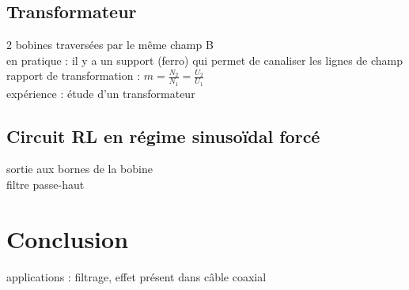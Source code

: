 \subsection{Transformateur}
2 bobines traversées par le même champ B \\
en pratique : il y a un support (ferro) qui permet de canaliser les lignes de champ \\
rapport de transformation : $m=\frac{N_2}{N_1}=\frac{U_2}{U_1}$ \\
expérience : étude d'un transformateur 

\subsection{Circuit RL en régime sinusoïdal forcé} 
sortie aux bornes de la bobine \\
filtre passe-haut \\


\section*{Conclusion}
applications : filtrage, effet présent dans câble coaxial \\

